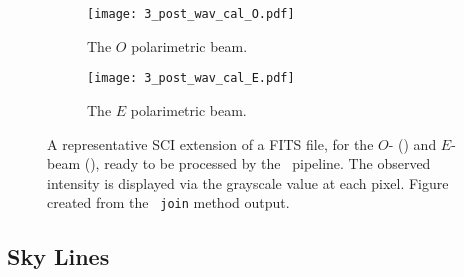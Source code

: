 \pagebreak

\begin{figure}[t]
    \centering
    \begin{subfigure}[b]{1.0 \textwidth}
        \centering
        \texttt{[image: 3\_post\_wav\_cal\_O.pdf]}
        \caption{The $O$ polarimetric beam.}
        \label{subfig:post_wav_O}
    \end{subfigure}
    \centering
    \begin{subfigure}[b]{1.0\textwidth}
        \centering
        \texttt{[image: 3\_post\_wav\_cal\_E.pdf]}
        \caption{The $E$ polarimetric beam.}
        \label{subfig:post_wav_E}
    \end{subfigure}
    \caption{
        A representative \gls{SCI} extension of a \gls{FITS} file, for the $O$- () and $E$-beam (), ready to be processed by the \polsalt\ pipeline.
        The observed intensity is displayed via the grayscale value at each pixel.
        Figure created from the \stops\ \texttt{join} method output.
    }
    \label{fig:polsalt_post_wav_cal}
\end{figure}



\pagebreak

\subsection{Sky Lines} \label{subsec:stops_skyline}

